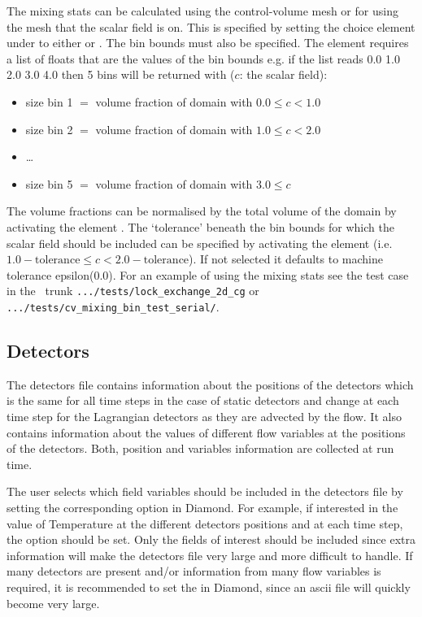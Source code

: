 The mixing stats can be calculated using the control-volume mesh or for \Poo using the mesh that the scalar field is on. This is specified by setting the choice element under  to either  or . The bin bounds must also be specified.  The element  requires a list of floats that are the values of the bin bounds e.g. if the list reads 0.0 1.0 2.0 3.0 4.0 then 5 bins will be returned with ($c$: the scalar field):
\begin{itemize}
\item size bin 1 $=$ volume fraction of domain with $0.0\leq c < 1.0$
\item size bin 2 $=$ volume fraction of domain with $1.0\leq c < 2.0$
\item \ldots 
\item size bin 5 $=$ volume fraction of domain with $3.0\leq c$
\end{itemize}

The volume fractions can be normalised by the total volume of the domain by activating the element . The `tolerance' beneath the bin bounds for which the scalar field should be included can be specified by activating the element  (i.e. $1.0-\mathrm{tolerance} \leq c < 2.0-\mathrm{tolerance}$). If not selected it defaults to machine tolerance epsilon(0.0). For an example of using the mixing stats see the test case in the \fluidity\ trunk \lstinline[language = bash]+.../tests/lock_exchange_2d_cg+ or \lstinline[language = bash]+.../tests/cv_mixing_bin_test_serial/+.

\subsection{Detectors}
\label{sec:diagnostics_detectors}
The detectors file contains information about the positions of the detectors which is the same for all time steps in the case of static detectors and change at each time step for the Lagrangian detectors as they are advected by the flow. It also contains information about the values of different flow variables at the positions of the detectors. Both, position and variables information are collected at run time.

The user selects which field variables should be included in the detectors file by setting the corresponding option in Diamond. For example, if interested in the value of Temperature at the different detectors positions and at each time step, the option   should be set. Only the fields of interest should be included since extra information will make the detectors file very large and more difficult to handle. If many detectors are present and/or information from many flow variables is required, it is recommended to set the  in Diamond, since an ascii file will quickly become very large.

